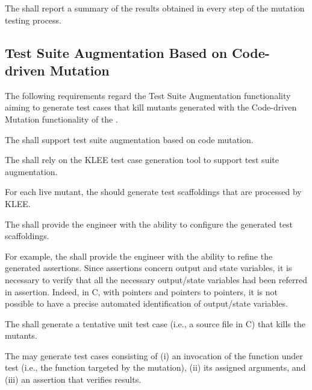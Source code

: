 \RQ{} The \FAQAS shall report a summary of the results obtained in every step of the mutation testing process. 




\subsection{Test Suite Augmentation Based on Code-driven Mutation}
\label{sec:codeDrivenAugmentation}

The following requirements regard the Test Suite Augmentation functionality aiming to generate test cases that kill mutants generated with the Code-driven Mutation functionality of the \FAQAS.

\RQ{} The \FAQAS shall support test suite augmentation based on code mutation.

\RQ{} The \FAQAS shall rely on the KLEE test case generation tool to support test suite augmentation.

\RQ{} For each live mutant, the \FAQAS should generate test scaffoldings that are processed by KLEE.

\RQ{} The \FAQAS shall provide the engineer with the ability to configure the generated test scaffoldings.


\remark For example, the \FAQAS shall provide the engineer with the ability to refine the generated assertions. Since assertions concern output and state variables, it is necessary to verify that all the necessary output/state variables had been referred in assertion. Indeed, in C, with pointers and pointers to pointers, it is not possible to have a precise automated identification of output/state variables.

\RQ{} The \FAQAS shall generate a tentative unit test case (i.e., a source file in C) that kills the mutants.

\remark  The \FAQAS may generate test cases consisting of (i) an invocation of the function under test (i.e., the function targeted by the mutation), (ii) its assigned arguments, and (iii) an assertion that verifies results.

